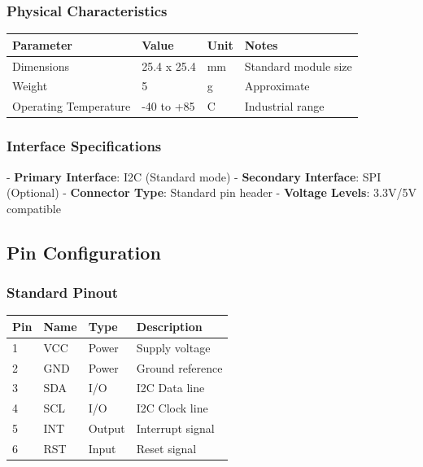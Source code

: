 \documentclass[11pt,a4paper]{article}
\begin{document}
\subsubsection{Physical Characteristics}

\begin{table}[H]
\centering
\begin{tabular}{llll}
\toprule
Parameter & Value & Unit & Notes \\
\midrule
Dimensions & 25.4 x 25.4 & mm & Standard module size \\
Weight & 5 & g & Approximate \\
Operating Temperature & -40 to +85 & \textdegree{}C & Industrial range \\
\bottomrule
\end{tabular}
\end{table}


\subsubsection{Interface Specifications}

- \textbf{Primary Interface}: I2C (Standard mode)
- \textbf{Secondary Interface}: SPI (Optional)
- \textbf{Connector Type}: Standard pin header
- \textbf{Voltage Levels}: 3.3V/5V compatible

\subsection{Pin Configuration}

\subsubsection{Standard Pinout}

\begin{table}[H]
\centering
\begin{tabular}{llll}
\toprule
Pin & Name & Type & Description \\
\midrule
1 & VCC & Power & Supply voltage \\
2 & GND & Power & Ground reference \\
3 & SDA & I/O & I2C Data line \\
4 & SCL & I/O & I2C Clock line \\
5 & INT & Output & Interrupt signal \\
6 & RST & Input & Reset signal \\
\bottomrule
\end{tabular}
\end{table}
\end{document}
